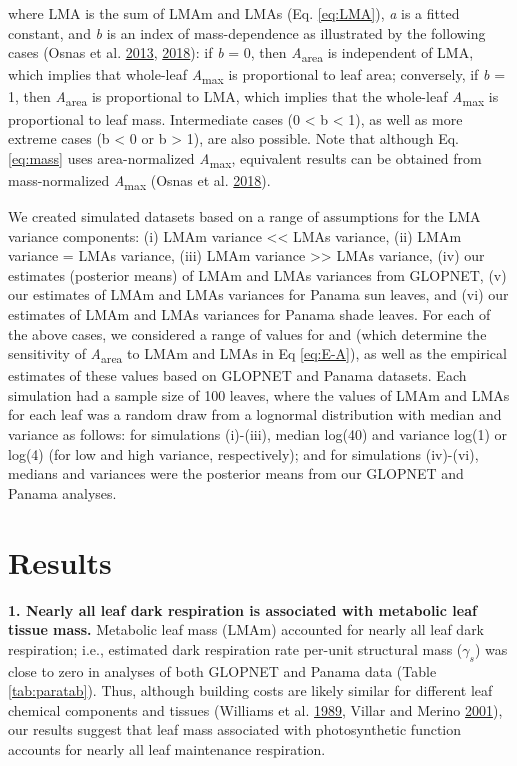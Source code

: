 \documentclass[
  12pt,
]{article}
\begin{document}
where LMA is the sum of LMAm and LMAs (Eq. \eqref{eq:LMA}), \emph{a} is a fitted constant, and \emph{b} is an index of mass-dependence as illustrated by the following cases (Osnas et al. \protect\hyperlink{ref-Osnas2013}{2013}, \protect\hyperlink{ref-Osnas2018}{2018}): if \emph{b} = 0, then \emph{A}\textsubscript{area} is independent of LMA, which implies that whole-leaf \emph{A}\textsubscript{max} is proportional to leaf area; conversely, if \emph{b} = 1, then \emph{A}\textsubscript{area} is proportional to LMA, which implies that the whole-leaf \emph{A}\textsubscript{max} is proportional to leaf mass.
Intermediate cases (0 \textless{} b \textless{} 1), as well as more extreme cases (b \textless{} 0 or b \textgreater{} 1), are also possible.
Note that although Eq. \eqref{eq:mass} uses area-normalized \emph{A}\textsubscript{max}, equivalent results can be obtained from mass-normalized \emph{A}\textsubscript{max} (Osnas et al. \protect\hyperlink{ref-Osnas2018}{2018}).

We created simulated datasets based on a range of assumptions for the LMA variance components: (i) LMAm variance \textless\textless{} LMAs variance, (ii) LMAm variance = LMAs variance, (iii) LMAm variance \textgreater\textgreater{} LMAs variance, (iv) our estimates (posterior means) of LMAm and LMAs variances from GLOPNET, (v) our estimates of LMAm and LMAs variances for Panama sun leaves, and (vi) our estimates of LMAm and LMAs variances for Panama shade leaves.
For each of the above cases, we considered a range of values for and (which determine the sensitivity of \emph{A}\textsubscript{area} to LMAm and LMAs in Eq \eqref{eq:E-A}), as well as the empirical estimates of these values based on GLOPNET and Panama datasets.
Each simulation had a sample size of 100 leaves, where the values of LMAm and LMAs for each leaf was a random draw from a lognormal distribution with median and variance as follows: for simulations (i)-(iii), median log(40) and variance log(1) or log(4) (for low and high variance, respectively); and for simulations (iv)-(vi), medians and variances were the posterior means from our GLOPNET and Panama analyses.

\hypertarget{results}{%
\section{Results}\label{results}}

\textbf{1. Nearly all leaf dark respiration is associated with metabolic leaf tissue mass.}
Metabolic leaf mass (LMAm) accounted for nearly all leaf dark respiration; i.e., estimated dark respiration rate per-unit structural mass (\(\gamma_s\)) was close to zero in analyses of both GLOPNET and Panama data (Table \ref{tab:paratab}).
Thus, although building costs are likely similar for different leaf chemical components and tissues (Williams et al. \protect\hyperlink{ref-Williams1989}{1989}, Villar and Merino \protect\hyperlink{ref-Villar2001}{2001}), our results suggest that leaf mass associated with photosynthetic function accounts for nearly all leaf maintenance respiration.
\end{document}
